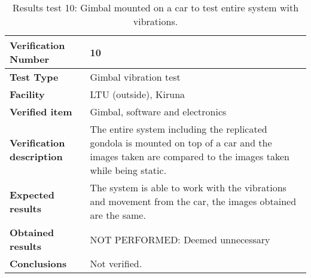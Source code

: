 \begin{table}[H]
\centering

\begin{tabular}{|m{}| m{} |}
\hline
\textbf{Verification Number} 		& 10 					\\ \hline
\textbf{Test Type} 					& Gimbal vibration test	\\ \hline
\textbf{Facility} 					& LTU (outside), Kiruna \\ \hline
\textbf{Verified item} 				& Gimbal, software and electronics \\ \hline

\textbf{Verification description} 	& The entire system including the replicated gondola is mounted on top of a car and the images taken are compared to the images taken while being static. \\ \hline

\textbf{Expected results} 			& The system is able to work with the vibrations and movement from the car, the images obtained are the same. \\ \hline

\textbf{Obtained results} 			& NOT PERFORMED: Deemed unnecessary \\ \hline

\textbf{Conclusions} 				& Not verified.		\\ \hline
\end{tabular}
\caption{Results test 10: Gimbal mounted on a car to test entire system with vibrations.}
\label{tab:testresult10:gimbal-car}
\end{table}


\raggedbottom
